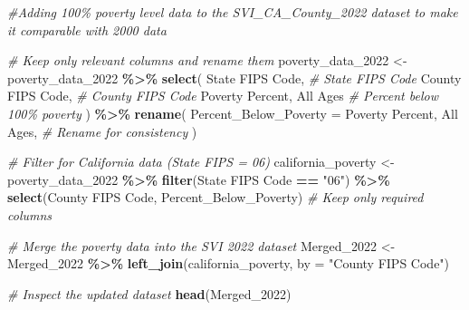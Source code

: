 \documentclass[
]{article}
\newenvironment{Shaded}{\begin{snugshade}}{\end{snugshade}}
\newcommand{\AttributeTok}[1]{\textcolor[rgb]{0.13,0.29,0.53}{#1}}
\newcommand{\CommentTok}[1]{\textcolor[rgb]{0.56,0.35,0.01}{\textit{#1}}}
\newcommand{\FunctionTok}[1]{\textcolor[rgb]{0.13,0.29,0.53}{\textbf{#1}}}
\newcommand{\NormalTok}[1]{#1}
\newcommand{\OtherTok}[1]{\textcolor[rgb]{0.56,0.35,0.01}{#1}}
\newcommand{\SpecialCharTok}[1]{\textcolor[rgb]{0.81,0.36,0.00}{\textbf{#1}}}
\newcommand{\StringTok}[1]{\textcolor[rgb]{0.31,0.60,0.02}{#1}}
\begin{document}
\begin{Shaded}
\begin{Highlighting}[]
\CommentTok{\#Adding 100\% poverty level data to the SVI\_CA\_County\_2022 dataset to make it comparable with 2000 data}

\CommentTok{\# Keep only relevant columns and rename them}
\NormalTok{poverty\_data\_2022 }\OtherTok{\textless{}{-}}\NormalTok{ poverty\_data\_2022 }\SpecialCharTok{\%\textgreater{}\%}
  \FunctionTok{select}\NormalTok{(}
    \StringTok{\textasciigrave{}}\AttributeTok{State FIPS Code}\StringTok{\textasciigrave{}}\NormalTok{,                  }\CommentTok{\# State FIPS Code}
    \StringTok{\textasciigrave{}}\AttributeTok{County FIPS Code}\StringTok{\textasciigrave{}}\NormalTok{,                 }\CommentTok{\# County FIPS Code}
    \StringTok{\textasciigrave{}}\AttributeTok{Poverty Percent, All Ages}\StringTok{\textasciigrave{}}         \CommentTok{\# Percent below 100\% poverty}
\NormalTok{  ) }\SpecialCharTok{\%\textgreater{}\%}
  \FunctionTok{rename}\NormalTok{(}
    \StringTok{\textasciigrave{}}\AttributeTok{Percent\_Below\_Poverty}\StringTok{\textasciigrave{}} \OtherTok{=} \StringTok{\textasciigrave{}}\AttributeTok{Poverty Percent, All Ages}\StringTok{\textasciigrave{}}\NormalTok{,  }\CommentTok{\# Rename for consistency}
\NormalTok{  )}

\CommentTok{\# Filter for California data (State FIPS = 06)}
\NormalTok{california\_poverty }\OtherTok{\textless{}{-}}\NormalTok{ poverty\_data\_2022 }\SpecialCharTok{\%\textgreater{}\%}
  \FunctionTok{filter}\NormalTok{(}\StringTok{\textasciigrave{}}\AttributeTok{State FIPS Code}\StringTok{\textasciigrave{}} \SpecialCharTok{==} \StringTok{"06"}\NormalTok{) }\SpecialCharTok{\%\textgreater{}\%}
  \FunctionTok{select}\NormalTok{(}\StringTok{\textasciigrave{}}\AttributeTok{County FIPS Code}\StringTok{\textasciigrave{}}\NormalTok{, }\StringTok{\textasciigrave{}}\AttributeTok{Percent\_Below\_Poverty}\StringTok{\textasciigrave{}}\NormalTok{) }\CommentTok{\# Keep only required columns}

\CommentTok{\# Merge the poverty data into the SVI 2022 dataset}
\NormalTok{Merged\_2022 }\OtherTok{\textless{}{-}}\NormalTok{ Merged\_2022 }\SpecialCharTok{\%\textgreater{}\%}
  \FunctionTok{left\_join}\NormalTok{(california\_poverty, }\AttributeTok{by =} \StringTok{"County FIPS Code"}\NormalTok{)}

\CommentTok{\# Inspect the updated dataset}
\FunctionTok{head}\NormalTok{(Merged\_2022)}
\end{Highlighting}
\end{Shaded}
\end{document}

